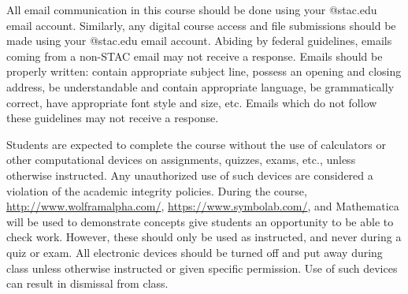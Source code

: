 \documentclass[11pt,letterpaper]{article}
\begin{document}
All email communication in this course should be done using your @stac.edu email account. Similarly, any digital course access and file submissions should be made using your @stac.edu email account. Abiding by federal guidelines, emails coming from a non-STAC email may not receive a response. Emails should be properly written: contain appropriate subject line, possess an opening and closing address, be understandable and contain appropriate language, be grammatically correct, have appropriate font style and size, etc. Emails which do not follow these guidelines may not receive a response.
\sectionbreak



Students are expected to complete the course without the use of calculators or other computational devices on assignments, quizzes, exams, etc., unless otherwise instructed. Any unauthorized use of such devices are considered a violation of the academic integrity policies. During the course, \href{http://www.wolframalpha.com/}{http://www.wolframalpha.com/}, \href{https://www.symbolab.com/}{https://www.symbolab.com/}, and Mathematica will be used to demonstrate concepts give students an opportunity to be able to check work. However, these should only be used as instructed, and never during a quiz or exam. All electronic devices should be turned off and put away during class unless otherwise instructed or given specific permission. Use of such devices can result in dismissal from class.
\sectionbreak
\end{document}
